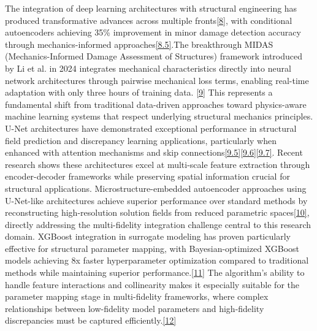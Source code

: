 \documentclass[12pt,a4paper]{report}
\begin{document}
The integration of deep learning architectures with structural engineering has produced transformative advances across multiple fronts\href{https://doi.org/10.3390/s20102778}{[8]}, with conditional autoencoders achieving 35\% improvement in minor damage detection accuracy through mechanics-informed approaches\href{https://arxiv.org/html/2402.15492v1}{[8.5]}.The breakthrough MIDAS (Mechanics-Informed Damage Assessment of Structures) framework introduced by Li et al. in 2024 integrates mechanical characteristics directly into neural network architectures through pairwise mechanical loss terms, enabling real-time adaptation with only three hours of training data. \href{https://doi.org/10.1038/s41467-024-52501-4}{[9]} This represents a fundamental shift from traditional data-driven approaches toward physics-aware machine learning systems that respect underlying structural mechanics principles. 
U-Net architectures have demonstrated exceptional performance in structural field prediction and discrepancy learning applications, particularly when enhanced with attention mechanisms and skip connections\href{https://link.springer.com/chapter/10.1007/978-3-319-24574-4_28}{[9.5]}\href{https://www.semanticscholar.org/paper/Attention-U-Net:-Learning-Where-to-Look-for-the-Oktay-Schlemper/ae1c89817a3a239e5344293138bdd80293983460}{[9.6]}\href{https://www.sciencedirect.com/science/article/pii/S0955598622001753}{[9.7]}. Recent research shows these architectures excel at multi-scale feature extraction through encoder-decoder frameworks while preserving spatial information crucial for structural applications. Microstructure-embedded autoencoder approaches using U-Net-like architectures achieve superior performance over standard methods by reconstructing high-resolution solution fields from reduced parametric spaces\href{https://doi.org/10.1007/s00466-024-02568-z}{[10]}, directly addressing the multi-fidelity integration challenge central to this research domain. 
XGBoost integration in surrogate modeling has proven particularly effective for structural parameter mapping, with Bayesian-optimized XGBoost models achieving 8x faster hyperparameter optimization compared to traditional methods while maintaining superior performance.\href{https://doi.org/10.1016/j.engstruct.2023.117307}{[11]} The algorithm's ability to handle feature interactions and collinearity makes it especially suitable for the parameter mapping stage in multi-fidelity frameworks, where complex relationships between low-fidelity model parameters and high-fidelity discrepancies must be captured efficiently.\href{https://www.researchgate.net/figure/The-performance-of-XGBoost-surrogate-models-in-the-training-and-testing-for-predicting_fig5_372412960}{[12]}
\end{document}
